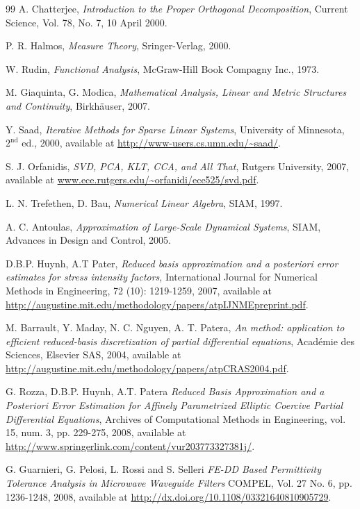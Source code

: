 \begin{thebibliography}{99}
 A. Chatterjee, \emph{Introduction to the Proper Orthogonal Decomposition}, Current Science, Vol. 78, No. 7, 10 April 2000.

 P. R. Halmos, \emph{Measure Theory}, Sringer-Verlag, 2000.

 W. Rudin, \emph{Functional Analysis}, McGraw-Hill Book Compagny Inc., 1973.

  M. Giaquinta, G. Modica, \emph{Mathematical Analysis, Linear and Metric Structures and Continuity}, Birkh\"{a}user, 2007.

 Y. Saad, \emph{Iterative Methods for Sparse Linear Systems}, University of Minnesota, $2^\mathrm{nd}$ ed., 2000, available at \url{http://www-users.cs.umn.edu/~saad/}.

 S. J. Orfanidis, \emph{SVD, PCA, KLT, CCA, and All That}, Rutgers University, 2007, available at \url{www.ece.rutgers.edu/~orfanidi/ece525/svd.pdf}.

 L. N. Trefethen, D. Bau, \emph{Numerical Linear Algebra}, SIAM, 1997.

 A. C. Antoulas, \emph{Approximation of Large-Scale Dynamical Systems}, SIAM, Advances in Design and Control, 2005.

 D.B.P. Huynh, A.T Pater, \emph{Reduced basis approximation and a posteriori error estimates for stress intensity factors}, International Journal for Numerical Methods in Engineering, 72 (10): 1219-1259, 2007, available at \url{http://augustine.mit.edu/methodology/papers/atpIJNMEpreprint.pdf}.

 M. Barrault, Y. Maday, N. C. Nguyen, A. T. Patera, \emph{An  method: application to efficient reduced-basis discretization of partial differential equations}, Acad\'{e}mie des Sciences, Elsevier SAS, 2004, available at \url{http://augustine.mit.edu/methodology/papers/atpCRAS2004.pdf}.

 G. Rozza, D.B.P. Huynh, A.T. Patera \emph{ Reduced Basis Approximation and a Posteriori Error Estimation for Affinely Parametrized Elliptic Coercive Partial Differential Equations}, Archives of Computational Methods in Engineering, vol. 15, num. 3, pp. 229-275, 2008, available at \url{http://www.springerlink.com/content/vur203773327381j/}.

 G. Guarnieri, G. Pelosi, L. Rossi and S. Selleri \emph{FE-DD Based Permittivity Tolerance Analysis in Microwave Waveguide Filters} COMPEL, Vol. 27 No. 6, pp. 1236-1248, 2008, available at \url{http://dx.doi.org/10.1108/03321640810905729}.


\end{thebibliography}
